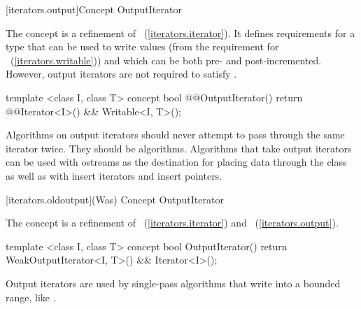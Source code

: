 
[iterators.output]{Concept OutputIterator}


\begin{addedblock}
\pnum
The  concept is a refinement of
~(\ref{iterators.iterator}). It defines requirements for a type that
can be used to write values (from the requirement for
~(\ref{iterators.writable})) and which can be both pre- and post-incremented.
However, output iterators are not required to
satisfy .

%
\begin{codeblock}
  template <class I, class T>
  concept bool @@OutputIterator() {
    return @@Iterator<I>() && Writable<I, T>();
  }
\end{codeblock}
\end{addedblock}

\pnum
\enternote
{}
\textit{}
Algorithms on output iterators should never attempt to pass through the same iterator twice.
They should be
algorithms.
Algorithms that take output iterators can be used with ostreams as the destination
for placing data through the
class as well as with insert iterators and insert pointers.
\exitnote

\begin{addedblock}
{\color{oldclr}
[iterators.oldoutput]{(Was) Concept OutputIterator}

\pnum
The  concept is a refinement of ~(\ref{iterators.iterator}) and
~(\ref{iterators.output}).

\begin{codeblock}
  template <class I, class T>
  concept bool OutputIterator() {
    return WeakOutputIterator<I, T>() && Iterator<I>();
  }
\end{codeblock}

\pnum
\enternote Output iterators are used by single-pass
algorithms that write into a bounded range, like .
\exitnote
} %
\end{addedblock}

